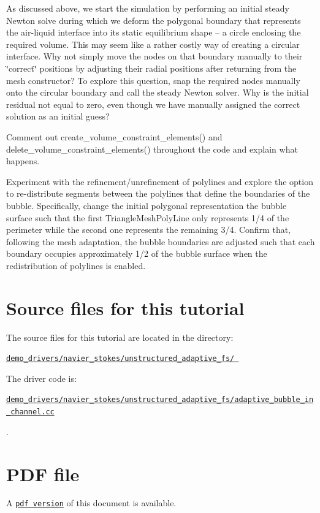 \begin{DoxyEnumerate}
\item As discussed above, we start the simulation by performing an initial steady Newton solve during which we deform the polygonal boundary that represents the air-\/liquid interface into its static equilibrium shape -- a circle enclosing the required volume. This may seem like a rather costly way of creating a circular interface. Why not simply move the nodes on that boundary manually to their \char`\"{}correct\char`\"{} positions by adjusting their radial positions after returning from the mesh constructor? To explore this question, snap the required nodes manually onto the circular boundary and call the steady Newton solver. Why is the initial residual not equal to zero, even though we have manually assigned the correct solution as an initial guess?
\item Comment out {\ttfamily create\+\_\+volume\+\_\+constraint\+\_\+elements()} and {\ttfamily delete\+\_\+volume\+\_\+constraint\+\_\+elements()} throughout the code and explain what happens.
\item Experiment with the refinement/unrefinement of polylines and explore the option to re-\/distribute segments between the polylines that define the boundaries of the bubble. Specifically, change the initial polygonal representation the bubble surface such that the first {\ttfamily Triangle\+Mesh\+Poly\+Line} only represents 1/4 of the perimeter while the second one represents the remaining 3/4. Confirm that, following the mesh adaptation, the bubble boundaries are adjusted such that each boundary occupies approximately 1/2 of the bubble surface when the redistribution of polylines is enabled.
\end{DoxyEnumerate}

 

\hypertarget{index_sources}{}\section{Source files for this tutorial}\label{index_sources}

\begin{DoxyItemize}
\item The source files for this tutorial are located in the directory\+: \begin{center} \href{../../../../demo_drivers/navier_stokes/unstructured_adaptive_fs/}{\tt demo\+\_\+drivers/navier\+\_\+stokes/unstructured\+\_\+adaptive\+\_\+fs/ } \end{center} 
\item The driver code is\+: \begin{center} \href{../../../../demo_drivers/navier_stokes/unstructured_adaptive_fs/adaptive_bubble_in_channel.cc}{\tt demo\+\_\+drivers/navier\+\_\+stokes/unstructured\+\_\+adaptive\+\_\+fs/adaptive\+\_\+bubble\+\_\+in\+\_\+channel.\+cc} \end{center}  .
\end{DoxyItemize}



 

 \hypertarget{index_pdf}{}\section{P\+D\+F file}\label{index_pdf}
A \href{../latex/refman.pdf}{\tt pdf version} of this document is available. 
